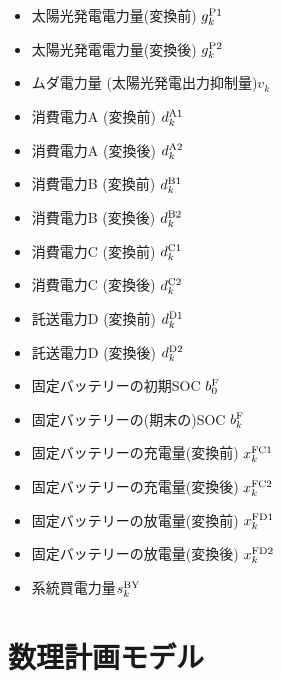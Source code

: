 \documentclass{jarticle}
\newcommand{\IB}{$\bullet$}
\newcommand{\IC}{$\circ$}
\begin{document}
 \begin{itemize}
  \item[\IB] 太陽光発電電力量(変換前) $g^{\rm P1}_{k}$
  \item[\IC] 太陽光発電電力量(変換後) $g^{\rm P2}_{k}$
  \item[\IC] ムダ電力量 (太陽光発電出力抑制量)$v_{k}$ \\[-2.5ex]
  \item[\IC] 消費電力A (変換前) $d^{\rm A1}_{k}$
  \item[\IB] 消費電力A (変換後) $d^{\rm A2}_{k}$
  \item[\IC] 消費電力B (変換前) $d^{\rm B1}_{k}$
  \item[\IB] 消費電力B (変換後) $d^{\rm B2}_{k}$
  \item[\IC] 消費電力C (変換前) $d^{\rm C1}_{k}$
  \item[\IB] 消費電力C (変換後) $d^{\rm C2}_{k}$
  \item[\IC] 託送電力D (変換前) $d^{\rm D1}_{k}$
  \item[\IC] 託送電力D (変換後) $d^{\rm D2}_{k}$
  \item[\IB] 固定バッテリーの初期SOC $b^{\rm F}_{0}$
  \item[\IC] 固定バッテリーの(期末の)SOC $b^{\rm F}_{k}$
  \item[\IC] 固定バッテリーの充電量(変換前) $x^{\rm FC1}_{k}$
  \item[\IC] 固定バッテリーの充電量(変換後) $x^{\rm FC2}_{k}$
  \item[\IC] 固定バッテリーの放電量(変換前) $x^{\rm FD1}_{k}$
  \item[\IC] 固定バッテリーの放電量(変換後) $x^{\rm FD2}_{k}$ \\[-2.5ex]

  \item[\IC] 系統買電力量$s^{\rm BY}_{k}$
\end{itemize}


\section{数理計画モデル}
\end{document}
